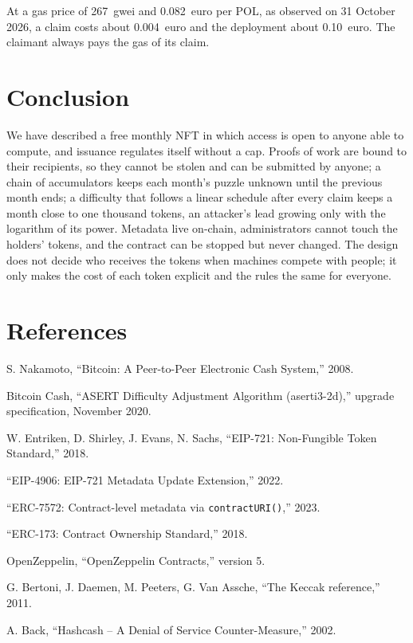 \documentclass[10pt,letterpaper]{article}
\begin{document}
At a gas price of 267~gwei and 0.082~euro per POL, as observed on 31 October 2026, a claim costs about 0.004~euro
and the deployment about 0.10~euro. The claimant always pays the gas of its claim.

\section{Conclusion}

We have described a free monthly NFT in which access is open to anyone able to compute, and issuance regulates
itself without a cap. Proofs of work are bound to their recipients, so they cannot be stolen and can be submitted by
anyone; a chain of accumulators keeps each month's puzzle unknown until the previous month ends; a difficulty that
follows a linear schedule after every claim keeps a month close to one thousand tokens, an attacker's lead growing
only with the logarithm of its power. Metadata live on-chain, administrators cannot touch the holders' tokens, and
the contract can be stopped but never changed. The design does not decide who receives the tokens when machines
compete with people; it only makes the cost of each token explicit and the rules the same for everyone.

\section*{References}

\begin{enumerate}[label={[\arabic*]},leftmargin=2.2em,itemsep=2pt]
  \item S. Nakamoto, ``Bitcoin: A Peer-to-Peer Electronic Cash System,'' 2008.
  \item Bitcoin Cash, ``ASERT Difficulty Adjustment Algorithm (aserti3-2d),'' upgrade specification, November 2020.
  \item W. Entriken, D. Shirley, J. Evans, N. Sachs, ``EIP-721: Non-Fungible Token Standard,'' 2018.
  \item ``EIP-4906: EIP-721 Metadata Update Extension,'' 2022.
  \item ``ERC-7572: Contract-level metadata via \texttt{contractURI()},'' 2023.
  \item ``ERC-173: Contract Ownership Standard,'' 2018.
  \item OpenZeppelin, ``OpenZeppelin Contracts,'' version 5.
  \item G. Bertoni, J. Daemen, M. Peeters, G. Van Assche, ``The Keccak reference,'' 2011.
  \item A. Back, ``Hashcash -- A Denial of Service Counter-Measure,'' 2002.
\end{enumerate}
\end{document}
